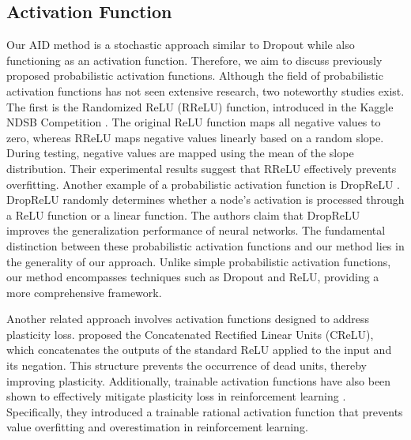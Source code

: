 \subsection{Activation Function}
Our AID method is a stochastic approach similar to Dropout while also functioning as an activation function.
Therefore, we aim to discuss previously proposed probabilistic activation functions.
Although the field of probabilistic activation functions has not seen extensive research, two noteworthy studies exist.
The first is the Randomized ReLU (RReLU) function, introduced in the Kaggle NDSB Competition \cite{xu2015empirical}.
The original ReLU function maps all negative values to zero, whereas RReLU maps negative values linearly based on a random slope.
During testing, negative values are mapped using the mean of the slope distribution.
Their experimental results suggest that RReLU effectively prevents overfitting.
Another example of a probabilistic activation function is DropReLU \cite{liang2021drop}.
DropReLU randomly determines whether a node's activation is processed through a ReLU function or a linear function.
The authors claim that DropReLU improves the generalization performance of neural networks.
The fundamental distinction between these probabilistic activation functions and our method lies in the generality of our approach.
Unlike simple probabilistic activation functions, our method encompasses techniques such as Dropout and ReLU, providing a more comprehensive framework.

Another related approach involves activation functions designed to address plasticity loss.
\citep{abbas2023loss} proposed the Concatenated Rectified Linear Units (CReLU), which concatenates the outputs of the standard ReLU applied to the input and its negation.
This structure prevents the occurrence of dead units, thereby improving plasticity.
Additionally, trainable activation functions have also been shown to effectively mitigate plasticity loss in reinforcement learning \citep{delfosseadaptive}.
Specifically, they introduced a trainable rational activation function that prevents value overfitting and overestimation in reinforcement learning.


